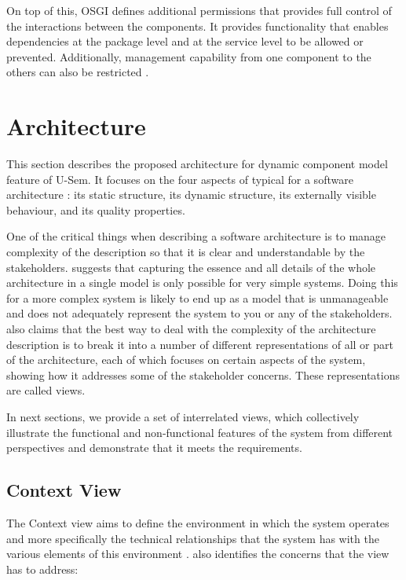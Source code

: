 On top of this, OSGI defines additional permissions that provides full control of the interactions between the components. It provides functionality that enables dependencies at the package level and at the service level to be allowed or prevented. Additionally, management capability from one component to the others can also be restricted \cite{Parrend}.


\section{Architecture}
\label{sec:architecture}

This section describes the proposed architecture for dynamic component model feature of U-Sem. It focuses on the four aspects of typical for a software architecture \cite{Rozanski}: its static structure, its dynamic structure, its externally visible behaviour, and its quality properties.

One of the critical things when describing a software architecture is to manage complexity of the description so that it is clear and understandable by the stakeholders. \cite{Rozanski} suggests that capturing the essence and all details of the whole architecture in a single model is only possible for very simple systems. Doing this for a more complex system is likely to end up as a model that is unmanageable and does not adequately represent the system to you or any of the stakeholders. \cite{Rozanski} also claims that the best way to deal with the complexity of the architecture description is to break it into a number of different representations of all or part of the architecture, each of which focuses on certain aspects of the system, showing how it addresses some of the stakeholder concerns. These representations are called views.

In next sections, we provide a set of interrelated views, which collectively illustrate the functional and non-functional features of the system from different perspectives and demonstrate that it meets the requirements.

\subsection{Context View}

The Context view aims to define the environment in which the system operates and more specifically the technical relationships that the system has with the various elements of this environment \cite{Woods}. \cite{Woods} also identifies the concerns that the view has to address:

